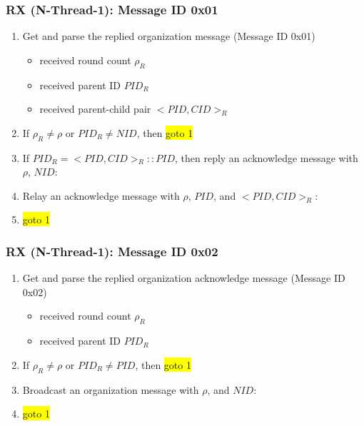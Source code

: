 \documentclass[letterpaper,9pt]{article}
\begin{document}
\subsubsection{RX (N-Thread-1): Message ID 0x01}

\begin{enumerate}
	\item Get and parse the replied organization message (Message ID 0x01)
	\begin{itemize}
		\item received round count $\rho_R$
		\item received parent ID $PID_R$
		\item received parent-child pair $<PID,CID>_R$
	\end{itemize}
		\item If $\rho_R \neq \rho$ or $PID_R \neq NID$, then \colorbox{yellow}{goto 1}
		\item If $PID_R = <PID,CID>_R::PID$, then reply an acknowledge message with $\rho$, $NID$:\\
		\item Relay an acknowledge message with $\rho$, $PID$, and  $<PID,CID>_R$:\\
	\item \colorbox{yellow}{goto 1}	
\end{enumerate}

\subsubsection{RX (N-Thread-1): Message ID 0x02}

\begin{enumerate}
	\item Get and parse the replied organization acknowledge message (Message ID 0x02)
	\begin{itemize}
		\item received round count $\rho_R$
		\item received parent ID $PID_R$
	\end{itemize}
	\item If $\rho_R \neq \rho$ or $PID_R \neq PID$, then \colorbox{yellow}{goto 1}
		\item Broadcast an organization message with $\rho$, and $NID$:\\
	\item \colorbox{yellow}{goto 1}	
\end{enumerate}
\end{document}
